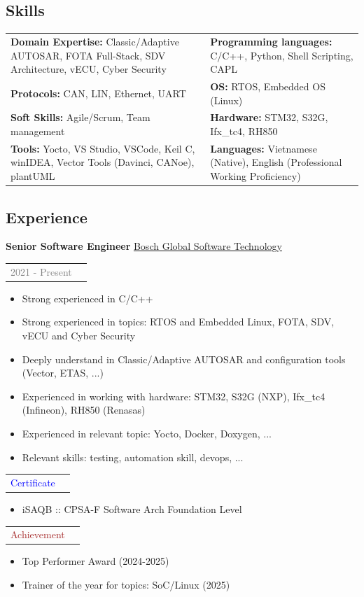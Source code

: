\documentclass[11pt]{article}
\begin{document}
\subsection*{Skills}
\begin{tabular}{ll}
\textbf{Domain Expertise:} Classic/Adaptive AUTOSAR, FOTA Full-Stack, SDV Architecture, vECU, Cyber Security & \textbf{Programming languages:} C/C++, Python, Shell Scripting, CAPL \\
\textbf{Protocols:} CAN, LIN, Ethernet, UART &  \textbf{OS:} RTOS, Embedded OS (Linux) \\
\textbf{Soft Skills:} Agile/Scrum, Team management& \textbf{Hardware:} STM32, S32G, Ifx_tc4, RH850 \\
\textbf{Tools:} Yocto, VS Studio, VSCode, Keil C, winIDEA, Vector Tools (Davinci, CANoe), plantUML & \textbf{Languages:} Vietnamese (Native), English (Professional Working Proficiency) \\
\end{tabular}

\subsection*{Experience}
\textbf{Senior Software Engineer} \underline{Bosch Global Software Technology}
\begin{tabular}{ll}
\textcolor{gray}{2021 - Present} 
\end{tabular}
\begin{itemize}
    \item Strong experienced in C/C++
    \item Strong experienced in topics: RTOS and Embedded Linux, FOTA, SDV, vECU and Cyber Security
    \item Deeply understand in Classic/Adaptive AUTOSAR and configuration tools (Vector, ETAS, ...)
    \item Experienced in working with hardware: STM32, S32G (NXP), Ifx_tc4 (Infineon), RH850 (Renasas)
    \item Experienced in relevant topic: Yocto, Docker, Doxygen, ...
    \item Relevant skills: testing, automation skill, devops, ...
\end{itemize}
\begin{tabular}{ll}
\textcolor{blue}{Certificate} 
\end{tabular}
\begin{itemize}
    \item iSAQB :: CPSA-F Software Arch Foundation Level
\end{itemize}
\begin{tabular}{ll}
\textcolor{brown}{Achievement} 
\end{tabular}
\begin{itemize}
    \item Top Performer Award (2024-2025)
    \item Trainer of the year for topics: SoC/Linux (2025)
\end{itemize}
\end{document}
